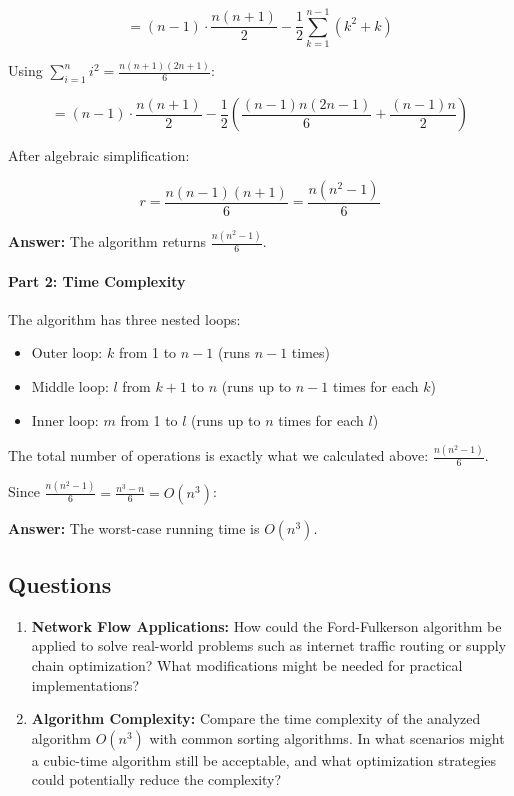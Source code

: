 \documentclass{article}
\begin{document}
$$= (n-1) \cdot \frac{n(n+1)}{2} - \frac{1}{2}\sum_{k=1}^{n-1} (k^2 + k)$$

Using $\sum_{i=1}^{n} i^2 = \frac{n(n+1)(2n+1)}{6}$:

$$= (n-1) \cdot \frac{n(n+1)}{2} - \frac{1}{2}\left(\frac{(n-1)n(2n-1)}{6} + \frac{(n-1)n}{2}\right)$$

After algebraic simplification:

$$r = \frac{n(n-1)(n+1)}{6} = \frac{n(n^2-1)}{6}$$

\textbf{Answer:} The algorithm returns $\frac{n(n^2-1)}{6}$.

\paragraph{Part 2: Time Complexity}

The algorithm has three nested loops:
\begin{itemize}
    \item Outer loop: $k$ from 1 to $n-1$ (runs $n-1$ times)
    \item Middle loop: $l$ from $k+1$ to $n$ (runs up to $n-1$ times for each $k$)
    \item Inner loop: $m$ from 1 to $l$ (runs up to $n$ times for each $l$)
\end{itemize}

The total number of operations is exactly what we calculated above: $\frac{n(n^2-1)}{6}$.

Since $\frac{n(n^2-1)}{6} = \frac{n^3 - n}{6} = O(n^3)$:

\textbf{Answer:} The worst-case running time is $O(n^3)$.

\subsection{Questions}

\begin{enumerate}
    \item \textbf{Network Flow Applications:} How could the Ford-Fulkerson algorithm be applied to solve real-world problems such as internet traffic routing or supply chain optimization? What modifications might be needed for practical implementations?
    
    \item \textbf{Algorithm Complexity:} Compare the time complexity of the analyzed algorithm $O(n^3)$ with common sorting algorithms. In what scenarios might a cubic-time algorithm still be acceptable, and what optimization strategies could potentially reduce the complexity?
\end{enumerate}
\end{document}
